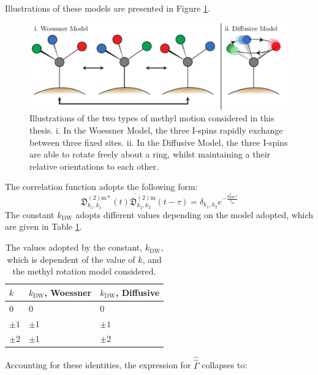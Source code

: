 Illustrations of these models are presented in Figure \ref{WoessnerDiffusive}.
\begin{figure}
\centering
\includegraphics[scale=0.8]{./Figures/SimonsFigs/WoessnerDiffusion.pdf}
\caption{Illustrations of the two types of methyl motion considered in this thesis. i. In the Woessner Model, the three I-spins rapidly exchange between three fixed sites. ii. In the Diffusive Model, the three I-spins are able to rotate freely about a ring, whilst maintaining a their relative orientations to each other.}
\label{WoessnerDiffusive}
\end{figure}
The correlation function adopts the following form\cite{RN4}:
\begin{equation}
\overline{\mathfrak{D}_{k_1,k_1}^{(2) \text{m}*}(t) \mathfrak{D}_{k_2,k_2}^{(2) \text{m}} (t - \tau)} = \delta_{k_1,k_2} e^{-\frac{k_{\text{DW}}^2 \tau}{\tau_{\text{m}}}}
\end{equation}
The constant $k_{\text{DW}}$ adopts different values depending on the model adopted, which are given in Table \ref{kDW}.
\begin{table}[]
\centering
\begin{tabular}{l|l|l}
$k$     & $k_{\text{DW}}$, Woessner & $k_{\text{DW}}$, Diffusive \\ \hline
$0$     & $0$                       & $0$                        \\
$\pm 1$ & $\pm 1$                   & $\pm 1$                    \\
$\pm 2$ & $\pm 1$                   & $\pm 2$                   
\end{tabular}
\caption{The values adopted by the constant, $k_{\text{DW}}$, which is dependent of the value of $k$, and the methyl rotation model considered.}
\label{kDW}
\end{table}
Accounting for these identities, the expression for $\hat{\hat{\Gamma}}$ collapses to:
